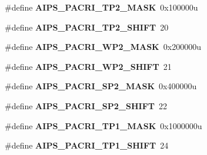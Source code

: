 \begin{DoxyCompactItemize}
\item 
\hypertarget{group___a_i_p_s___register___masks_gac91a6f9b0c76b236fb8276be6c535328}{}\#define {\bfseries A\+I\+P\+S\+\_\+\+P\+A\+C\+R\+I\+\_\+\+T\+P2\+\_\+\+M\+A\+S\+K}~0x100000u\label{group___a_i_p_s___register___masks_gac91a6f9b0c76b236fb8276be6c535328}

\item 
\hypertarget{group___a_i_p_s___register___masks_ga5c8d2595b82ad179d303f8f327e2dce3}{}\#define {\bfseries A\+I\+P\+S\+\_\+\+P\+A\+C\+R\+I\+\_\+\+T\+P2\+\_\+\+S\+H\+I\+F\+T}~20\label{group___a_i_p_s___register___masks_ga5c8d2595b82ad179d303f8f327e2dce3}

\item 
\hypertarget{group___a_i_p_s___register___masks_ga3494221d5caaa4d96d0299479a4e9218}{}\#define {\bfseries A\+I\+P\+S\+\_\+\+P\+A\+C\+R\+I\+\_\+\+W\+P2\+\_\+\+M\+A\+S\+K}~0x200000u\label{group___a_i_p_s___register___masks_ga3494221d5caaa4d96d0299479a4e9218}

\item 
\hypertarget{group___a_i_p_s___register___masks_gada1df2564483d22123ad32fc115a843d}{}\#define {\bfseries A\+I\+P\+S\+\_\+\+P\+A\+C\+R\+I\+\_\+\+W\+P2\+\_\+\+S\+H\+I\+F\+T}~21\label{group___a_i_p_s___register___masks_gada1df2564483d22123ad32fc115a843d}

\item 
\hypertarget{group___a_i_p_s___register___masks_ga5ef237602a2693d74728c4424a9de5cb}{}\#define {\bfseries A\+I\+P\+S\+\_\+\+P\+A\+C\+R\+I\+\_\+\+S\+P2\+\_\+\+M\+A\+S\+K}~0x400000u\label{group___a_i_p_s___register___masks_ga5ef237602a2693d74728c4424a9de5cb}

\item 
\hypertarget{group___a_i_p_s___register___masks_ga34d206e4644b39811d4cdebae9aeaad1}{}\#define {\bfseries A\+I\+P\+S\+\_\+\+P\+A\+C\+R\+I\+\_\+\+S\+P2\+\_\+\+S\+H\+I\+F\+T}~22\label{group___a_i_p_s___register___masks_ga34d206e4644b39811d4cdebae9aeaad1}

\item 
\hypertarget{group___a_i_p_s___register___masks_gab3d1df499e2d19b5205f506473b75598}{}\#define {\bfseries A\+I\+P\+S\+\_\+\+P\+A\+C\+R\+I\+\_\+\+T\+P1\+\_\+\+M\+A\+S\+K}~0x1000000u\label{group___a_i_p_s___register___masks_gab3d1df499e2d19b5205f506473b75598}

\item 
\hypertarget{group___a_i_p_s___register___masks_ga2c7ce4fcebcb8463b5e545c38816163c}{}\#define {\bfseries A\+I\+P\+S\+\_\+\+P\+A\+C\+R\+I\+\_\+\+T\+P1\+\_\+\+S\+H\+I\+F\+T}~24\label{group___a_i_p_s___register___masks_ga2c7ce4fcebcb8463b5e545c38816163c}


\end{DoxyCompactItemize}
